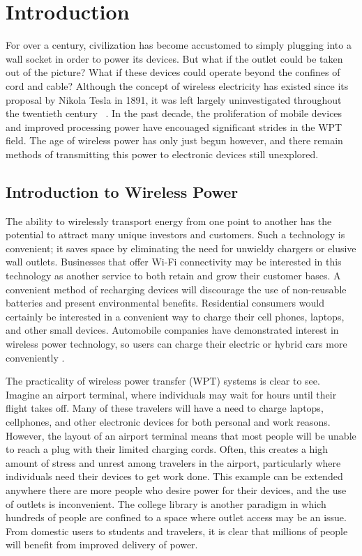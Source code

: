 \chapter{Introduction}
\label{ch:introduction}

For over a century, civilization has become accustomed to simply plugging into a wall socket in order to power its devices. But what if the outlet could be taken out of the picture? What if these devices could operate beyond the confines of cord and cable? Although the concept of wireless electricity has existed since its proposal by Nikola Tesla in 1891, it was left largely uninvestigated throughout the twentieth century ~\cite{NikkiT}. In the past decade, the proliferation of mobile devices and improved processing power have encouaged significant strides in the WPT field. The age of wireless power has only just begun however, and there remain methods of transmitting this power to electronic devices still unexplored.

\section{Introduction to Wireless Power}
The ability to wirelessly transport energy from one point to another has the potential to attract many unique investors and customers. Such a technology is convenient; it saves space by eliminating the need for unwieldy chargers or elusive wall outlets. Businesses that offer Wi-Fi connectivity may be interested in this technology as another service to both retain and grow their customer bases. A convenient method of recharging devices will discourage the use of non-reusable batteries and present environmental benefits. Residential consumers would certainly be interested in a convenient way to charge their cell phones, laptops, and other small devices. Automobile companies have demonstrated interest in wireless power technology, so users can charge their electric or hybrid cars more conveniently \cite{ToyotaNews}\cite{VolvoNews}.

The practicality of wireless power transfer (WPT) systems is clear to see. Imagine an airport terminal, where individuals may wait for hours until their flight takes off. Many of these travelers will have a need to charge laptops, cellphones, and other electronic devices for both personal and work reasons. However, the layout of an airport terminal means that most people will be unable to reach a plug with their limited charging cords. Often, this creates a high amount of stress and unrest among travelers in the airport, particularly where individuals need their devices to get work done. This example can be extended anywhere there are more people who desire power for their devices, and the use of outlets is inconvenient. The college library is another paradigm in which hundreds of people are confined to a space where outlet access may be an issue. From domestic users to students and travelers, it is clear that millions of people will benefit from improved delivery of power.


